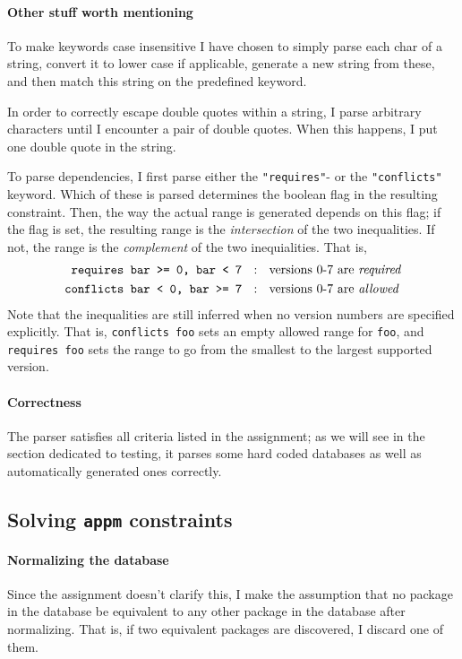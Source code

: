 \paragraph{Other stuff worth mentioning} To make keywords case insensitive I have chosen to simply parse each char of a string, convert it to lower case if applicable, generate a new string from these, and then match this string on the predefined keyword.

In order to correctly escape double quotes within a string, I parse arbitrary characters until I encounter a pair of double quotes. When this happens, I put one double quote in the string.

To parse dependencies, I first parse either the \texttt{"requires"}- or the \texttt{"conflicts"} keyword. Which of these is parsed determines the boolean flag in the resulting constraint. Then, the way the actual range is generated depends on this flag; if the flag is set, the resulting range is the \textit{intersection} of the two inequalities. If not, the range is the \textit{complement} of the two inequialities. That is,
\begin{align*}
  \texttt{requires bar >= 0, bar < 7}  & \ \ : \ \  \text{versions 0-7 are \it required} \\
  \texttt{conflicts bar < 0, bar >= 7} & \ \ : \ \  \text{versions 0-7 are \it allowed}
\end{align*}
Note that the inequalities are still inferred when no version numbers are specified explicitly. That is, \texttt{conflicts foo} sets an empty allowed range for \texttt{foo}, and \texttt{requires foo} sets the range to go from the smallest to the largest supported version.

\paragraph{Correctness}
\noindent The parser satisfies all criteria listed in the assignment; as we will see in the section dedicated to testing, it parses some hard coded databases as well as automatically generated ones correctly.


\subsection*{Solving \texttt{appm} constraints}

\paragraph{Normalizing the database}
Since the assignment doesn't clarify this, I make the assumption that no package in the database be equivalent to any other package in the database after normalizing. That is, if two equivalent packages are discovered, I discard one of them.

